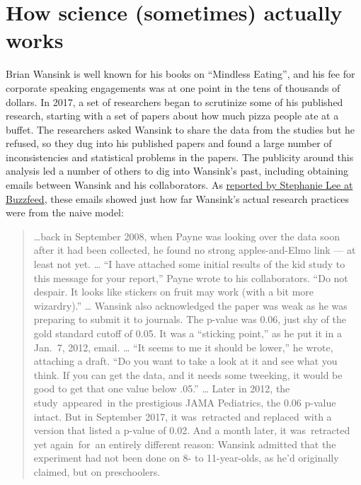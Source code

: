 \documentclass[12pt,]{book}
\theoremstyle{definition}
\theoremstyle{definition}
\theoremstyle{definition}
\theoremstyle{remark}
\begin{document}
\hypertarget{how-science-sometimes-actually-works}{%
\section{How science (sometimes) actually works}\label{how-science-sometimes-actually-works}}

Brian Wansink is well known for his books on ``Mindless Eating'', and his fee for corporate speaking engagements was at one point in the tens of thousands of dollars. In 2017, a set of researchers began to scrutinize some of his published research, starting with a set of papers about how much pizza people ate at a buffet. The researchers asked Wansink to share the data from the studies but he refused, so they dug into his published papers and found a large number of inconsistencies and statistical problems in the papers. The publicity around this analysis led a number of others to dig into Wansink's past, including obtaining emails between Wansink and his collaborators. As \href{https://www.buzzfeednews.com/article/stephaniemlee/brian-wansink-cornell-p-hacking}{reported by Stephanie Lee at Buzzfeed}, these emails showed just how far Wansink's actual research practices were from the naive model:

\begin{quote}
\ldots{}back in September 2008, when Payne was looking over the data soon after it had been collected, he found no strong apples-and-Elmo link --- at least not yet. \ldots{}
``I have attached some initial results of the kid study to this message for your report,'' Payne wrote to his collaborators. ``Do not despair. It looks like stickers on fruit may work (with a bit more wizardry).'' \ldots{}
Wansink also acknowledged the paper was weak as he was preparing to submit it to journals. The p-value was 0.06, just shy of the gold standard cutoff of 0.05. It was a ``sticking point,'' as he put it in a Jan.~7, 2012, email. \ldots{}
``It seems to me it should be lower,'' he wrote, attaching a draft. ``Do you want to take a look at it and see what you think. If you can get the data, and it needs some tweeking, it would be good to get that one value below .05.'' \ldots{}
Later in 2012, the study~appeared~in the prestigious JAMA Pediatrics, the 0.06 p-value intact. But in September 2017, it was~retracted and replaced~with a version that listed a p-value of 0.02. And a month later, it was~retracted yet again~for~an entirely different reason: Wansink admitted that the experiment had not been done on 8- to 11-year-olds, as he'd originally claimed, but on preschoolers.
\end{quote}
\end{document}
